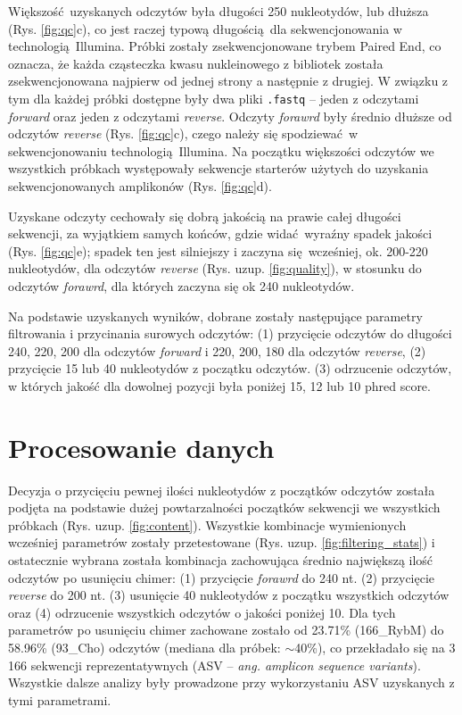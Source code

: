 \documentclass[two column, twoside, a4paper]{article}
\begin{document}
Większość uzyskanych odczytów była długości 250 nukleotydów, lub dłuższa (Rys. \ref{fig:qc}c), co jest raczej typową długością dla sekwencjonowania w technologią Illumina. Próbki zostały zsekwencjonowane trybem Paired End, co oznacza, że każda cząsteczka kwasu nukleinowego z bibliotek została zsekwencjonowana najpierw od jednej strony a następnie z drugiej. W związku z tym dla każdej próbki dostępne były dwa pliki \texttt{.fastq} -- jeden z odczytami \textit{forward} oraz jeden z odczytami \textit{reverse}. Odczyty \textit{forawrd} były średnio dłuższe od odczytów \textit{reverse} (Rys. \ref{fig:qc}c), czego należy się spodziewać w sekwencjonowaniu technologią Illumina. Na początku większości odczytów we wszystkich próbkach występowały sekwencje starterów użytych do uzyskania sekwencjonowanych amplikonów (Rys. \ref{fig:qc}d).

Uzyskane odczyty cechowały się dobrą jakością na prawie całej długości sekwencji, za wyjątkiem samych końców, gdzie widać wyraźny spadek jakości (Rys. \ref{fig:qc}e); spadek ten jest silniejszy i zaczyna się wcześniej, ok. 200-220 nukleotydów, dla odczytów \textit{reverse} (Rys. uzup. \ref{fig:quality}), w stosunku do odczytów \textit{forawrd}, dla których zaczyna się ok 240 nukleotydów.

Na podstawie uzyskanych wyników, dobrane zostały następujące parametry filtrowania i przycinania surowych odczytów: (1) przycięcie odczytów do długości 240, 220, 200 dla odczytów \textit{forward} i 220, 200, 180 dla odczytów \textit{reverse}, (2) przycięcie 15 lub 40 nukleotydów z początku odczytów. (3) odrzucenie odczytów, w których jakość dla dowolnej pozycji była poniżej 15, 12 lub 10 phred score.

\section{Procesowanie danych}

Decyzja o przycięciu pewnej ilości nukleotydów z początków odczytów została podjęta na podstawie dużej powtarzalności początków sekwencji we wszystkich próbkach (Rys. uzup. \ref{fig:content}). Wszystkie kombinacje wymienionych wcześniej parametrów zostały przetestowane (Rys. uzup. \ref{fig:filtering_stats}) i ostatecznie wybrana została kombinacja zachowująca średnio największą ilość odczytów po usunięciu chimer: (1) przycięcie \textit{forawrd} do 240 nt. (2) przycięcie \textit{reverse} do 200 nt. (3) usunięcie 40 nukleotydów z początku wszystkich odczytów oraz (4) odrzucenie wszystkich odczytów o jakości poniżej 10. Dla tych parametrów po usunięciu chimer zachowane zostało od 23.71\% (166\_RybM) do 58.96\% (93\_Cho) odczytów (mediana dla próbek: $\sim$40\%), co przekładało się na 3\,166 sekwencji reprezentatywnych (ASV -- \textit{ang. amplicon sequence variants}). Wszystkie dalsze analizy były prowadzone przy wykorzystaniu ASV uzyskanych z tymi parametrami.
\end{document}
